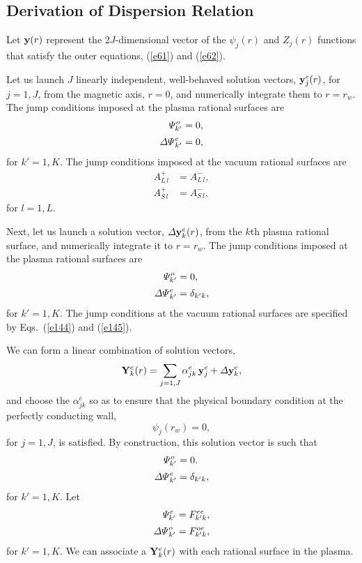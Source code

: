 \documentclass[12pt,prb,aps,notitlepage]{revtex4-1}
\begin{document}
\subsection{Derivation of Dispersion Relation}\label{sdisp}
Let ${\bf y}(r)$ represent the
$2J$-dimensional vector of the $\psi_j(r)$ and $Z_j(r)$ functions that satisfy the outer equations, (\ref{e61}) and (\ref{e62}). 

Let us launch $J$ linearly independent, well-behaved  solution vectors, ${\bf y}_j^e(r)$, for $j=1,J$, from the magnetic axis, 
$r=0$, and numerically integrate  them to $r=r_w$. The jump conditions imposed at the plasma rational surfaces are
\begin{align}
{\mit\Psi}_{k'}^o &= 0,\\[0.5ex]
{\mit\Delta\Psi}_{k'}^e &= 0,
\end{align}
for $k'=1,K$. The jump conditions imposed  at the vacuum rational surfaces are
\begin{align}\label{e144}
A_{L\,l}^+&= A_{L\,l}^-,\\[0.5ex]
A_{S\,l}^{+}& = A_{S\,l}^-,\label{e145}
\end{align}
for $l=1,L$. 

Next, let us launch  a solution vector, ${\mit\Delta}{\bf y}_k^e(r)$, from the $k$th plasma rational surface, and
numerically integrate it to $r=r_w$. 
The jump conditions  imposed at the 
plasma rational surfaces are
\begin{align}
{\mit\Psi}_{k'}^o &= 0,\\[0.5ex]
{\mit\Delta\Psi}_{k'}^e &= \delta_{k'k},
\end{align}
for $k'=1,K$. The jump conditions at the vacuum rational surfaces are
specified by Eqs.~(\ref{e144}) and (\ref{e145}).  

We can  form a linear combination of solution vectors,
\begin{equation}
{\bf Y}_k^e (r)= \sum_{j=1,J} \alpha_{jk}^e\,{\bf y}_j^e + {\mit\Delta}{\bf y}_k^e,
\end{equation}
and choose the $\alpha_{jk}^e$  so as to ensure that the physical boundary condition at the perfectly conducting wall,  
\begin{equation}\label{e162}
\psi_j(r_w) = 0,
\end{equation}
for $j=1,J$, is satisfied. 
By construction, this solution vector is such that 
\begin{align}
{\mit\Psi}_{k'}^o &= 0.\\[0.5ex]
{\mit\Delta\Psi}_{k'}^e &= \delta_{k'k},
\end{align}
for $k'=1,K$. 
Let
\begin{align}
{\mit\Psi}_{k'}^e&=F_{k'k}^{ee},\\[0.5ex]
 {\mit\Delta\Psi}_{k'}^o &=F_{k'k}^{oe},
\end{align}
for $k'=1,K$.  We can associate a ${\bf Y}_k^e (r)$ with each  rational surface in the plasma. 
\end{document}

